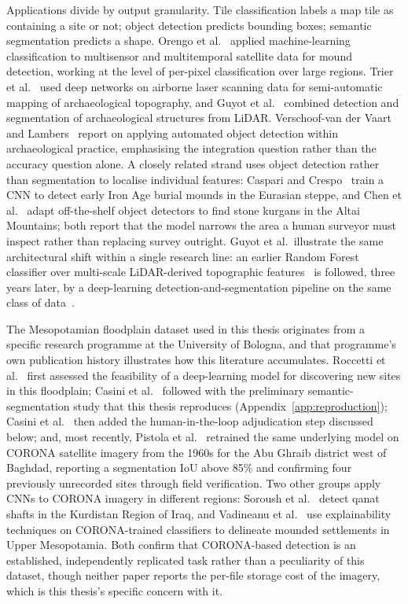 Applications divide by output granularity.
Tile classification labels a map tile as containing a site or not; object detection
predicts bounding boxes; semantic segmentation predicts a shape.
Orengo et al.~\cite{Orengo20} applied machine-learning classification to multisensor
and multitemporal satellite data for mound detection, working at the level of
per-pixel classification over large regions.
Trier et al.~\cite{Trier19} used deep networks on airborne laser scanning data for
semi-automatic mapping of archaeological topography, and
Guyot et al.~\cite{Guyot21} combined detection and segmentation of archaeological
structures from LiDAR.
Verschoof-van der Vaart and Lambers~\cite{Verschoof22} report on applying automated
object detection within archaeological practice, emphasising the integration
question rather than the accuracy question alone.
A closely related strand uses object detection rather than segmentation to
localise individual features: Caspari and Crespo~\cite{Caspari19} train a CNN to
detect early Iron Age burial mounds in the Eurasian steppe, and Chen et
al.~\cite{Chen21} adapt off-the-shelf object detectors to find stone kurgans in the
Altai Mountains; both report that the model narrows the area a human surveyor must
inspect rather than replacing survey outright.
Guyot et al.\ illustrate the same architectural shift within a single research
line: an earlier Random Forest classifier over multi-scale LiDAR-derived
topographic features~\cite{Guyot18} is followed, three years later, by a
deep-learning detection-and-segmentation pipeline on the same class of
data~\cite{Guyot21}.

The Mesopotamian floodplain dataset used in this thesis originates from a specific
research programme at the University of Bologna, and that programme's own
publication history illustrates how this literature accumulates.
Roccetti et al.~\cite{Roccetti20} first assessed the feasibility of a deep-learning
model for discovering new sites in this floodplain; Casini et
al.~\cite{Casini22} followed with the preliminary semantic-segmentation study that
this thesis reproduces (Appendix~\ref{app:reproduction}); Casini et
al.~\cite{Casini23} then added the human-in-the-loop adjudication step discussed
below; and, most recently, Pistola et al.~\cite{Pistola25} retrained the same
underlying model on CORONA satellite imagery from the 1960s for the Abu Ghraib
district west of Baghdad, reporting a segmentation IoU above 85\% and confirming
four previously unrecorded sites through field verification.
Two other groups apply CNNs to CORONA imagery in different regions: Soroush et
al.~\cite{Soroush20} detect qanat shafts in the Kurdistan Region of Iraq, and
Vadineanu et al.~\cite{Vadineanu24} use explainability techniques on
CORONA-trained classifiers to delineate mounded settlements in Upper Mesopotamia.
Both confirm that CORONA-based detection is an established, independently
replicated task rather than a peculiarity of this dataset, though neither paper
reports the per-file storage cost of the imagery, which is this thesis's specific
concern with it.

